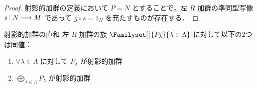 \documentclass[algtopo_main]{subfiles}
\begin{document}
\begin{proof}
    射影的加群の定義において $P = N$ とすることで，左 $R$ 加群の準同型写像 $s \colon N \longrightarrow M$ であって $g \circ s = 1_N$ を充たすものが存在する．
\end{proof}

\begin{myprop}[label=prop:proj-mod-dp]{射影的加群の直和}
    左 $R$ 加群の族 $\Familyset[\big]{P_\lambda}{\lambda \in \Lambda}$ に対して以下の2つは同値：
    \begin{enumerate}
        \item $\forall \lambda \in \Lambda$ に対して $P_\lambda$ が射影的加群
        \item $\displaystyle\bigoplus_{\lambda \in \Lambda} P_\lambda$ が射影的加群
    \end{enumerate}
\end{myprop}
\end{document}
